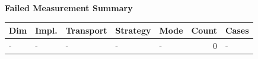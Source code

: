 \documentclass{article}
\begin{document}
\begin{center}
{\fontsize{8.0pt}{9.4pt}\selectfont
\textbf{Failed Measurement Summary}

\vspace{0.6em}
\begin{tabular}{lllllrl}
\hline
Dim & Impl. & Transport & Strategy & Mode & Count & Cases \\
\hline
- & - & - & - & - & 0 & - \\
\hline
\end{tabular}
}
\end{center}
\end{document}
